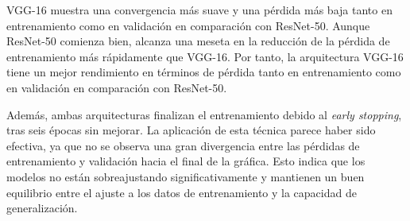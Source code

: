 VGG-16 muestra una convergencia más suave y una pérdida más baja tanto en entrenamiento como en validación en comparación con ResNet-50. Aunque ResNet-50 comienza bien, alcanza una meseta en la reducción de la pérdida de entrenamiento más rápidamente que VGG-16. Por tanto, la arquitectura VGG-16 tiene un mejor rendimiento en términos de pérdida tanto en entrenamiento como en validación en comparación con ResNet-50. 

Además, ambas arquitecturas finalizan el entrenamiento debido al \textit{early stopping}, tras seis épocas sin mejorar. La aplicación de esta técnica parece haber sido efectiva, ya que no se observa una gran divergencia entre las pérdidas de entrenamiento y validación hacia el final de la gráfica. Esto indica que los modelos no están sobreajustando significativamente y mantienen un buen equilibrio entre el ajuste a los datos de entrenamiento y la capacidad de generalización.


